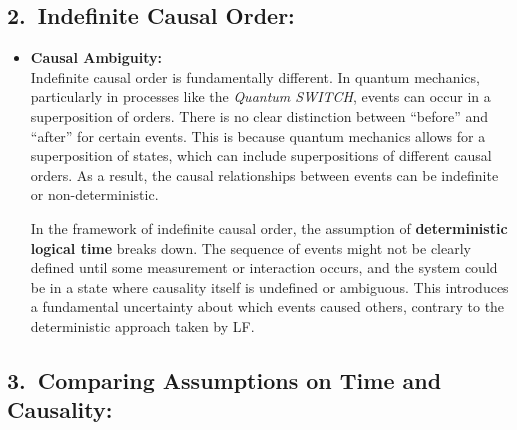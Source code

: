 \documentclass[../../../OAE-SPEC-MAIN.tex]{subfiles}
\begin{document}
\subsection*{2.\ Indefinite Causal Order:}

\begin{itemize}[leftmargin=1.5em]
\item \textbf{Causal Ambiguity:}\\
  Indefinite causal order is fundamentally different. In quantum mechanics, particularly in processes like the \emph{Quantum SWITCH}, events can occur in a superposition of orders. There is no clear distinction between ``before'' and ``after'' for certain events. This is because quantum mechanics allows for a superposition of states, which can include superpositions of different causal orders. As a result, the causal relationships between events can be indefinite or non-deterministic.

  In the framework of indefinite causal order, the assumption of \textbf{deterministic logical time} breaks down. The sequence of events might not be clearly defined until some measurement or interaction occurs, and the system could be in a state where causality itself is undefined or ambiguous. This introduces a fundamental uncertainty about which events caused others, contrary to the deterministic approach taken by LF.
\end{itemize}

\subsection*{3.\ Comparing Assumptions on Time and Causality:}
\end{document}
